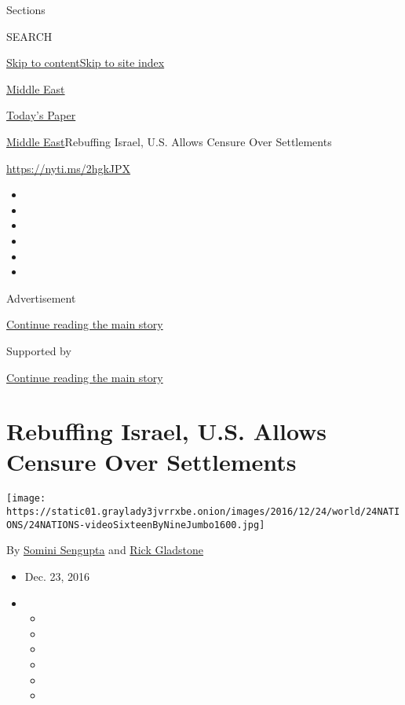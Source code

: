 Sections

SEARCH

\protect\hyperlink{site-content}{Skip to
content}\protect\hyperlink{site-index}{Skip to site index}

\href{https://www.nytimes3xbfgragh.onion/section/world/middleeast}{Middle
East}

\href{https://myaccount.nytimes3xbfgragh.onion/auth/login?response_type=cookie\&client_id=vi}{}

\href{https://www.nytimes3xbfgragh.onion/section/todayspaper}{Today's
Paper}

\href{/section/world/middleeast}{Middle East}\textbar{}Rebuffing Israel,
U.S. Allows Censure Over Settlements

\url{https://nyti.ms/2hgkJPX}

\begin{itemize}
\item
\item
\item
\item
\item
\item
\end{itemize}

Advertisement

\protect\hyperlink{after-top}{Continue reading the main story}

Supported by

\protect\hyperlink{after-sponsor}{Continue reading the main story}

\hypertarget{rebuffing-israel-us-allows-censure-over-settlements}{%
\section{Rebuffing Israel, U.S. Allows Censure Over
Settlements}\label{rebuffing-israel-us-allows-censure-over-settlements}}

\texttt{[image: https://static01.graylady3jvrrxbe.onion/images/2016/12/24/world/24NATIONS/24NATIONS-videoSixteenByNineJumbo1600.jpg]}

By \href{http://www.nytimes3xbfgragh.onion/by/somini-sengupta}{Somini
Sengupta} and
\href{https://www.nytimes3xbfgragh.onion/by/rick-gladstone}{Rick
Gladstone}

\begin{itemize}
\item
  Dec. 23, 2016
\item
  \begin{itemize}
  \item
  \item
  \item
  \item
  \item
  \item
  \end{itemize}
\end{itemize}

